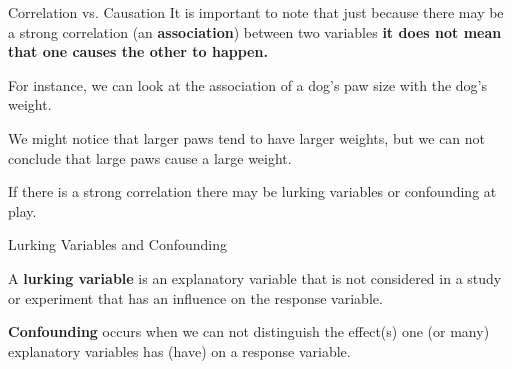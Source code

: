 \documentclass[t]{beamer}
\begin{document}
\begin{frame}{Correlation vs. Causation}
It is important to note that just because there may be a strong correlation (an {\color{blue}\textbf{association}}) between two variables \textbf{\alert{it does not mean that one causes the other to happen.}}	\newline\\	\pause

For instance, we can look at the association of a dog's paw size with the dog's weight. \newline\\	\pause

We might notice that larger paws tend to have larger weights, but we can not conclude that large paws cause a large weight.	\newline\\	\pause

If there is a strong correlation there may be lurking variables or confounding at play.	
\end{frame}

\begin{frame}{Lurking Variables and Confounding}
\begin{tcolorbox}[colframe=green!20!black, colback = green!30!white,title=\textbf{Lurking Varaible}]
A \textbf{lurking variable} is an explanatory variable that is not considered in a study or experiment that has an influence on the response variable.
\end{tcolorbox}
\bigskip	\pause

\begin{tcolorbox}[colframe=green!20!black, colback = green!30!white,title=\textbf{Confounding}]
\textbf{Confounding} occurs when we can not distinguish the effect(s) one (or many) explanatory variables has (have) on a response variable.
\end{tcolorbox}
\end{frame}
\end{document}
